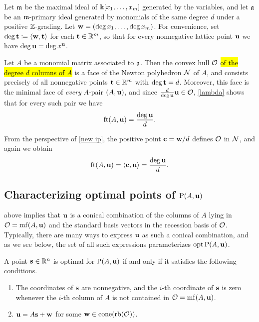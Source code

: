 \documentclass{amsart}
\begin{document}
\begin{example}
   \label{ex: m-primary homogeneous case}
   Let $\mathfrak{m}$ be the maximal ideal of  $\Bbbk[x_1,\ldots,x_m]$ generated by the variables, and let $\mathfrak{a}$ be an $\mathfrak{m}$-primary ideal generated by monomials of the same degree $d$ under a positive $\mathbb{Z}$-grading.
   Let $\mathbf{w} = (\deg x_1,\ldots,\deg x_m)$.
   For convenience, set $\deg \mathbf{t} \coloneqq \langle \mathbf{w}, \mathbf{t} \rangle$ for each $\mathbf{t} \in \mathbb{R}^m$, so that for every nonnegative lattice point $\mathbf{u}$ we have $\deg \mathbf{u} = \deg x^{\mathbf{u}}$.

   Let $A$ be a monomial matrix associated to $\mathfrak{a}$.
   Then the convex hull $\mathcal{O}$ \hl{of the degree $d$ columns of $A$}
   is a face of the Newton polyhedron $\mathcal{N}$ of $A$, and consists precisely of all nonnegative points $\mathbf{t} \in \mathbb{R}^m$ with $\deg \mathbf{t}  = d$.
   Moreover, this face is the minimal face of \emph{every} $A$-pair $(A,\mathbf{u})$, and since $\frac d{\deg \mathbf{u}}\mathbf{u} \in \mathcal{O}$, \ref{lambda} shows that for every such pair we have
   \[
      \operatorname{ft}(A, \mathbf{u}) = \frac{\deg \mathbf{u}}{d}.
   \]

   From the perspective of \ref{new ip}, the positive point $\mathbf{c} = \mathbf{w}/d$ defines $\mathcal{O}$ in $\mathcal{N}$, and again we obtain
   \[
      \operatorname{ft}(A, \mathbf{u}) = \langle \mathbf{c}, \mathbf{u} \rangle = \frac{\deg \mathbf{u}}{d}.
   \]
\end{example}

\subsection{Characterizing optimal points of $\mathrm{P}(A,\mathbf{u})$}

 above implies that $\mathbf{u}$ is a conical combination of the columns of $A$ lying in $\mathcal{O} = \operatorname{mf}(A,\mathbf{u})$ and the standard basis vectors in the recession basis of $\mathcal{O}$.
Typically, there are many ways to express $\mathbf{u}$ as such a conical combination, and as we see below, the set of all such expressions parameterizes  $\operatorname{opt} \mathrm{P}(A, \mathbf{u})$.

\begin{proposition}\label{opt set: P}
   A point $\mathbf{s} \in \mathbb{R}^n$ is optimal for $\mathrm{P}(A, \mathbf{u})$ if and only if it satisfies the following conditions.
\begin{enumerate}[$(1)$]
\item  \label{mc coords: e} The coordinates of $\mathbf{s}$ are nonnegative, and the $i$-th coordinate of $\mathbf{s}$ is zero whenever the $i$-th column of $A$ is not contained in $\mathcal{O} = \operatorname{mf}(A, \mathbf{u})$.
\item  \label{mc decomposition: e} $\mathbf{u} = A \mathbf{s} + \mathbf{w}$ for some $\mathbf{w} \in  \operatorname{cone}(\operatorname{rb}(\mathcal{O}))$.
\end{enumerate}
\end{proposition}
\end{document}
